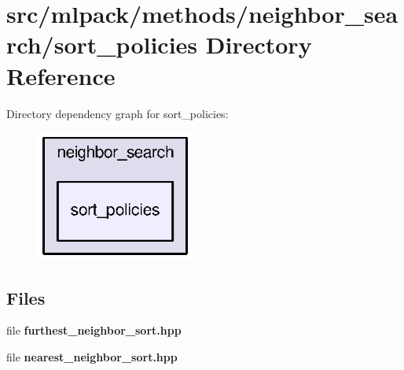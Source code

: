 \section{src/mlpack/methods/neighbor\+\_\+search/sort\+\_\+policies Directory Reference}
\label{dir_4b741b852c0cf24d06d11b492e004d31}
Directory dependency graph for sort\+\_\+policies\+:
\nopagebreak
\begin{figure}[H]
\begin{center}
\leavevmode
\includegraphics[width=148pt]{dir_4b741b852c0cf24d06d11b492e004d31_dep}
\end{center}
\end{figure}
\subsection*{Files}
\begin{DoxyCompactItemize}
\item 
file {\bf furthest\+\_\+neighbor\+\_\+sort.\+hpp}
\item 
file {\bf nearest\+\_\+neighbor\+\_\+sort.\+hpp}
\end{DoxyCompactItemize}
